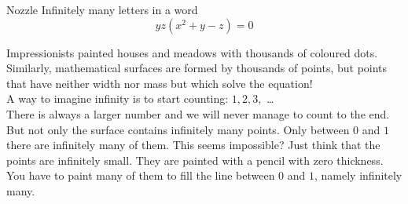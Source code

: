 \begin{surferPage}{Nozzle}
Infinitely many letters in a word\\
\smallskip
\[y z (x^2	+ y - z)	= 0\]

\vspace{0.3cm}
Impressionists painted houses and meadows with thousands of coloured dots. Similarly, mathematical surfaces are formed by thousands of points, but points that have neither width nor mass but which solve the equation! \\
\vspace{0.3cm}
A way to imagine infinity is to start counting: $1, 2, 3,$ \dots\\
There is always a larger number and we will never manage to count to the end.\\
\vspace{0.3cm}
But not only the surface contains infinitely many points. Only between $0$ and $1$ there are infinitely many of them. This seems impossible? Just think that the points are infinitely small. They are painted with a pencil with zero thickness. You have to paint many of them to fill the line between $0$ and $1$, namely infinitely many.
\end{surferPage}
